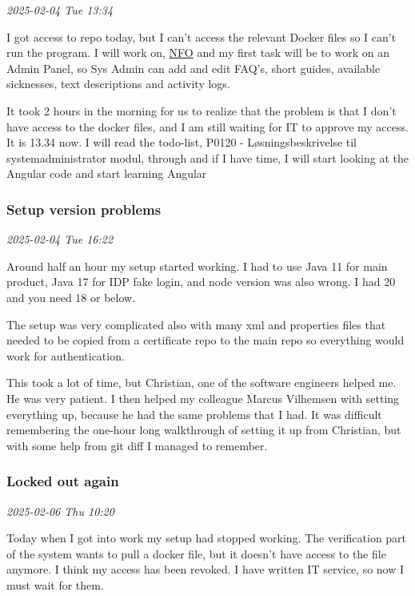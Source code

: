 \documentclass[../main.tex]{subfiles}
\begin{document}
\textit{2025-02-04 Tue 13:34}

I got access to repo today, but I can't access the relevant Docker files so I can't run the program. I will work on, \href{https://nationaltforsoegsoverblik.dk/}{NFO} and my first task will be to work on an Admin Panel, so Sys Admin can add and edit FAQ's, short guides, available sicknesses, text descriptions and activity logs.

It took 2 hours in the morning for us to realize that the problem is that I don't have access to the docker files, and I am still waiting for IT to approve my access. It is 13.34 now. I will read the todo-list, P0120 - Løsningsbeskrivelse til systemadministrator modul, through and if I have time, I will start looking at the Angular code and start learning Angular

\subsubsection{\textbf{Setup version problems}}

\textit{2025-02-04 Tue 16:22}

Around half an hour my setup started working. I had to use Java 11 for main product, Java 17 for IDP fake login, and node version was also wrong. I had 20 and you need 18 or below.

The setup was very complicated also with many xml and properties files that needed to be copied from a certificate repo to the main repo so everything would work for authentication.

This took a lot of time, but Christian, one of the software engineers helped me. He was very patient. I then helped my colleague Marcus Vilhemsen with setting everything up, because he had the same problems that I had. It was difficult remembering the one-hour long walkthrough of setting it up from Christian, but with some help from git diff I managed to remember.

\subsubsection{\textbf{Locked out again}}

\textit{2025-02-06 Thu 10:20}

Today when I got into work my setup had stopped working. The verification part of the system wants to pull a docker file, but it doesn't have access to the file anymore. I think my access has been revoked. I have written IT service, so now I must wait for them.
\end{document}
